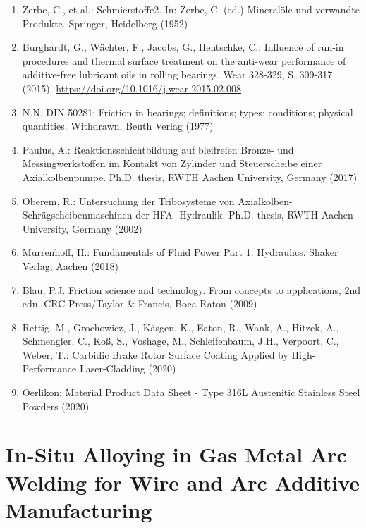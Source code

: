 \documentclass[10pt]{article}
\begin{document}
\begin{enumerate}
  \item Zerbe, C., et al.: Schmierstoffe2. In: Zerbe, C. (ed.) Mineralöle und verwandte Produkte. Springer, Heidelberg (1952)

  \item Burghardt, G., Wächter, F., Jacobs, G., Hentschke, C.: Influence of run-in procedures and thermal surface treatment on the anti-wear performance of additive-free lubricant oils in rolling bearings. Wear 328-329, S. 309-317 (2015). \href{https://doi.org/10.1016/j.wear.2015.02.008}{https://doi.org/10.1016/j.wear.2015.02.008}

  \item N.N. DIN 50281: Friction in bearings; definitions; types; conditions; physical quantities. Withdrawn, Beuth Verlag (1977)

  \item Paulus, A.: Reaktionsschichtbildung auf bleifreien Bronze- und Messingwerkstoffen im Kontakt von Zylinder und Steuerscheibe einer Axialkolbenpumpe. Ph.D. thesis, RWTH Aachen University, Germany (2017)

  \item Oberem, R.: Untersuchung der Tribosysteme von Axialkolben-Schrägscheibenmaschinen der HFA- Hydraulik. Ph.D. thesis, RWTH Aachen University, Germany (2002)

  \item Murrenhoff, H.: Fundamentals of Fluid Power Part 1: Hydraulics. Shaker Verlag, Aachen (2018)

  \item Blau, P.J. Friction science and technology. From concepts to applications, 2nd edn. CRC Press/Taylor \& Francis, Boca Raton (2009)

  \item Rettig, M., Grochowicz, J., Käsgen, K., Eaton, R., Wank, A., Hitzek, A., Schmengler, C., Koß, S., Voshage, M., Schleifenbaum, J.H., Verpoort, C., Weber, T.: Carbidic Brake Rotor Surface Coating Applied by High-Performance Laser-Cladding (2020)

  \item Oerlikon: Material Product Data Sheet - Type 316L Austenitic Stainless Steel Powders (2020)

\end{enumerate}

\section*{In-Situ Alloying in Gas Metal Arc Welding for Wire and Arc Additive Manufacturing }
\end{document}
